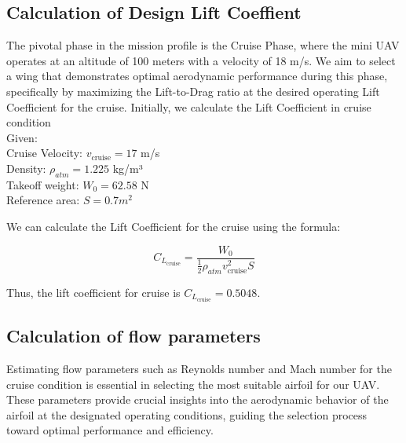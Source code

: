 \documentclass[12 pt]{article}
\begin{document}
\subsection{\large Calculation of Design Lift Coeffient}


\color{black}
The pivotal phase in the mission profile is the Cruise Phase, where the mini UAV operates at an altitude of 100 meters with a velocity of 18 m/s. We aim to select a wing that demonstrates optimal aerodynamic performance during this phase, specifically by maximizing the Lift-to-Drag ratio at the desired operating Lift Coefficient for the cruise. Initially, we calculate the Lift Coefficient in cruise condition \\
Given:\\
 Cruise Velocity: \( v_{\text{cruise}} = 17 \) m/s\\
Density: \( \rho_{atm} = 1.225 \) kg/m³\\
 Takeoff weight: \( W_0 = 62.58 \) N\\
 Reference area: \(S = 0.7 m^2\) 

We can calculate the Lift Coefficient for the cruise using the formula:

\[
C_{L_{\text{cruise}}} = \frac{W_0}{\frac{1}{2} \rho_{atm} v_{\text{cruise}}^2 S}    \tag{6.1} \]

Thus, the lift coefficient for cruise is \( C_{L_{\text{cruise}}} = 0.5048 \). 

\subsection{Calculation of flow parameters}
\color{black}
Estimating flow parameters such as Reynolds number and Mach number for the cruise condition is essential in selecting the most suitable airfoil for our UAV. These parameters provide crucial insights into the aerodynamic behavior of the airfoil at the designated operating conditions, guiding the selection process toward optimal performance and efficiency. 
\end{document}
